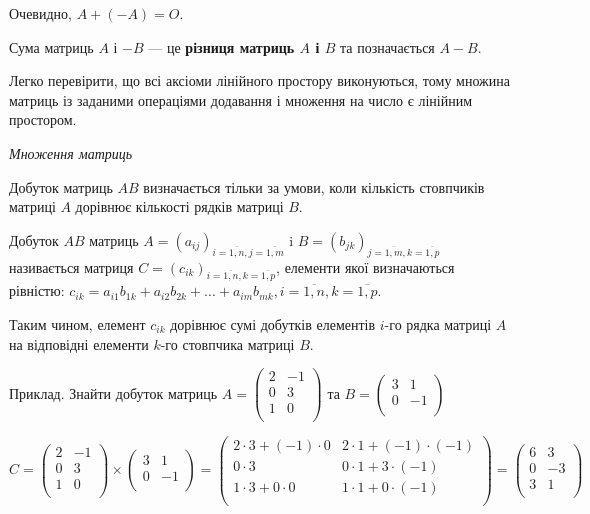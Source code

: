 Очевидно, $A + (-A) = O$.

\begin{definition}
	Сума матриць $A$ і $-B$ --- це \textbf{різниця матриць $A$ і $B$} та
	позначається $A - B$. 
\end{definition}

Легко перевірити, що всі аксіоми лінійного простору виконуються, тому
множина матриць із заданими операціями додавання і множення на число є
лінійним простором.

\textit{Множення матриць}

Добуток матриць $A B$ визначається тільки за умови, коли кількість
стовпчиків матриці $A$ дорівнює кількості рядків матриці $B$.

\begin{definition}
	Добуток $A B$ матриць $A = (a_{ij})_{i=\overline{1,n}, j=\overline{1,m}}$ i $B = (b_{jk})_{j=\overline{1,m}, k=\overline{1,p}}$
	називається матриця $C = (c_{ik})_{i=\overline{1,n}, k=\overline{1,p}}$, елементи якої визначаються рівністю:
	$c_{ik} = a_{i1}b_{1k} + a_{i2}b_{2k} + ... + a_{im}b_{mk}, i = \overline{1,n}, k = \overline{1,p}$.
\end{definition}

Таким чином, елемент $c_{ik}$ дорівнює сумі добутків елементів $i$-го рядка
матриці $A$ на відповідні елементи $k$-го стовпчика матриці $B$.

\begin{example}
Приклад. Знайти добуток матриць
$A = \begin{pmatrix}
	2 & -1 \\
	0 & 3 \\
	1 & 0 \\
\end{pmatrix}$ та $B = \begin{pmatrix}
	3 & 1 \\
	0 & -1 \\
\end{pmatrix}$

$C = \begin{pmatrix}
	2 & -1 \\
	0 & 3 \\
	1 & 0 \\
\end{pmatrix} \times \begin{pmatrix}
	3 & 1 \\
	0 & -1 \\
\end{pmatrix} = \begin{pmatrix}
	2 \cdot 3 + (-1) \cdot 0 	& 2 \cdot 1 + (-1) \cdot (-1) \\
	0 \cdot 3 					& 0 \cdot 1 + 3 \cdot (-1) \\
	1 \cdot 3 + 0 \cdot 0 		& 1 \cdot 1 + 0 \cdot (-1) \\
\end{pmatrix} = \begin{pmatrix}
	6 & 3 \\
	0 & -3 \\
	3 & 1 \\
\end{pmatrix}$
\end{example}

